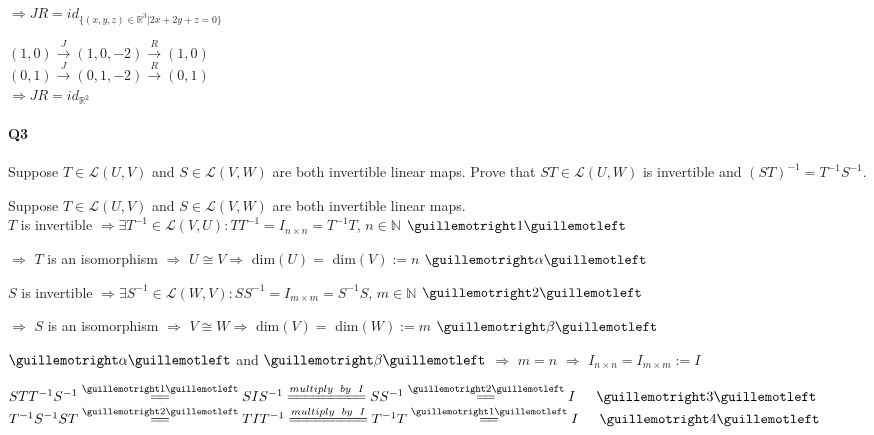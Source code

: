 \documentclass{article}
\begin{document}
$\Rightarrow JR = id_{ \{(x, y, z) ∈ \mathbb{R}^3 | 2x + 2y + z = 0\}}$


$(1,0) \stackrel{J}{\rightarrow} (1,0,-2) \stackrel{R}{\rightarrow}
(1,0) $\\
$(0,1) \stackrel{J}{\rightarrow} (0,1,-2) \stackrel{R}{\rightarrow}
(0,1) $\\

$\Rightarrow JR = id_{\mathbb{R}^2}$




\paragraph{Q3}Suppose $T ∈ \mathcal{L}(U, V )$ and $S ∈ \mathcal{L}(V, W )$ are both invertible linear
maps. Prove that $ST ∈ \mathcal{L}(U, W )$ is invertible and
$(ST)^{-1} = T^{-1} S^{-1}$.

\vspace{0.618 em}

Suppose $T ∈ \mathcal{L}(U, V)$ and $S ∈ \mathcal{L}(V, W)$ are both invertible linear
maps.\\

$T$ is invertible $\Rightarrow \exists T^{-1} \in \mathcal{L}(V,U):
TT^{-1}=I_{n\times n}=T^{-1}T$, $n \in \mathbb{N}$
$\guillemotright 1 \guillemotleft$

$\Rightarrow$ $T$ is an isomorphism $\Rightarrow$ $U
\cong V \Rightarrow$ dim$(U) =$ dim$(V) := n$ $\guillemotright \alpha \guillemotleft$

$S$ is invertible $\Rightarrow \exists S^{-1} \in \mathcal{L}(W,V):
SS^{-1}=I_{m\times m}=S^{-1}S$, $m \in \mathbb{N}$ $\guillemotright 2 \guillemotleft$

$\Rightarrow$ $S$ is an isomorphism $\Rightarrow$ $V
\cong W \Rightarrow$ dim$(V) = $ dim$(W) := m$ $\guillemotright \beta \guillemotleft$

$\guillemotright \alpha \guillemotleft$ and $\guillemotright \beta \guillemotleft$ $\Rightarrow$ $m = n$ $\Rightarrow$
$I_{n\times n} = I_{m\times m} := I$

$STT^{-1}S^{-1}\stackrel{\guillemotright 1 \guillemotleft}{=\joinrel=} S I
S^{-1}
\stackrel{multiply\enskip by\enskip
  I}{=\joinrel=\joinrel=\joinrel=\joinrel=\joinrel=\joinrel=\joinrel=\joinrel=}
SS^{-1}\stackrel{\guillemotright 2 \guillemotleft}{=\joinrel=}  I\enskip\enskip\enskip \guillemotright 3 \guillemotleft$\\
$T^{-1}S^{-1}ST\stackrel{\guillemotright 2 \guillemotleft}{=\joinrel=} T I
T^{-1}
\stackrel{multiply\enskip by\enskip
  I}{=\joinrel=\joinrel=\joinrel=\joinrel=\joinrel=\joinrel=\joinrel=\joinrel=}
T^{-1}T\stackrel{\guillemotright 1 \guillemotleft}{=\joinrel=}
I\enskip \quad\guillemotright 4 \guillemotleft
$\\
\end{document}
